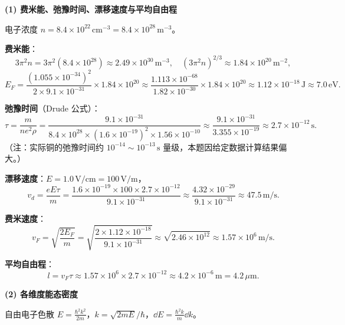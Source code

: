 \begin{derivationbox}[标准解题过程]
\textbf{(1) 费米能、弛豫时间、漂移速度与平均自由程}

电子浓度 $n=8.4\times10^{22}\,\text{cm}^{-3}=8.4\times10^{28}\,\text{m}^{-3}$。

\textbf{费米能}：
\begin{equation}
3\pi^2 n=3\pi^2(8.4\times10^{28})\approx2.49\times10^{30}\,\text{m}^{-3},
\quad (3\pi^2 n)^{2/3}\approx1.84\times10^{20}\,\text{m}^{-2},
\end{equation}
\begin{equation}
E_F=\frac{(1.055\times10^{-34})^2}{2\times9.1\times10^{-31}}\times1.84\times10^{20}
\approx\frac{1.113\times10^{-68}}{1.82\times10^{-30}}\times1.84\times10^{20}
\approx1.12\times10^{-18}\,\text{J}\approx\boxed{7.0\,\text{eV}.}
\end{equation}

\textbf{弛豫时间}（Drude 公式）：
\begin{equation}
\tau=\frac{m}{ne^2\rho}
=\frac{9.1\times10^{-31}}{8.4\times10^{28}\times(1.6\times10^{-19})^2\times1.56\times10^{-10}}
\approx\frac{9.1\times10^{-31}}{3.355\times10^{-19}}
\approx\boxed{2.7\times10^{-12}\,\text{s}.}
\end{equation}
（注：实际铜的弛豫时间约 $10^{-14}\sim10^{-13}\,\text{s}$ 量级，本题因给定数据计算结果偏大。）

\textbf{漂移速度}：$E=1.0\,\text{V/cm}=100\,\text{V/m}$，
\begin{equation}
v_d=\frac{eE\tau}{m}
=\frac{1.6\times10^{-19}\times100\times2.7\times10^{-12}}{9.1\times10^{-31}}
\approx\frac{4.32\times10^{-29}}{9.1\times10^{-31}}
\approx\boxed{47.5\,\text{m/s}.}
\end{equation}

\textbf{费米速度}：
\begin{equation}
v_F=\sqrt{\frac{2E_F}{m}}
=\sqrt{\frac{2\times1.12\times10^{-18}}{9.1\times10^{-31}}}
\approx\sqrt{2.46\times10^{12}}
\approx1.57\times10^6\,\text{m/s}.
\end{equation}

\textbf{平均自由程}：
\begin{equation}
l=v_F\tau\approx1.57\times10^6\times2.7\times10^{-12}
\approx\boxed{4.2\times10^{-6}\,\text{m}=4.2\,\mu\text{m}.}
\end{equation}

\textbf{(2) 各维度能态密度}

自由电子色散 $E=\frac{\hbar^2k^2}{2m}$，$k=\sqrt{2mE}/\hbar$，$\dd E=\frac{\hbar^2k}{m}\dd k$。


\end{derivationbox}
